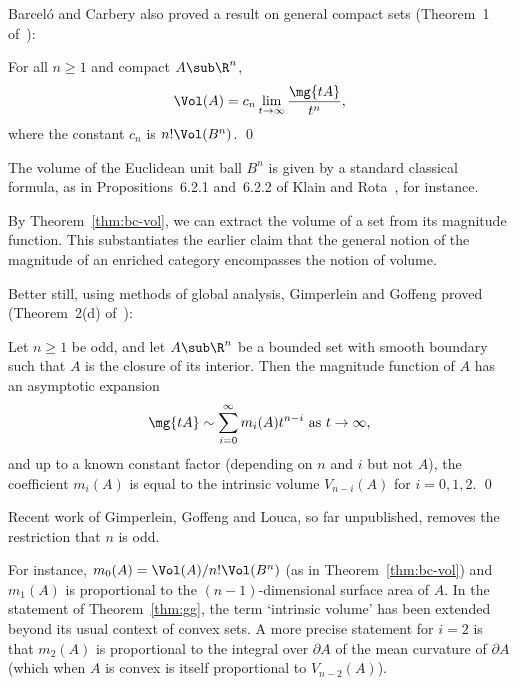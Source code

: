 Barcel\'o and Carbery also proved a result on general compact sets
(Theorem~1 of~\cite{BaCa}):

\begin{thm}
%
%
%
%
%
% 
For all $n \geq 1$ and compact $A \sub \R^n$, 
\[
\Vol(A) 
= 
c_n \lim_{t \to \infty} \frac{\mg{tA}}{t^n},
\]
where the constant $c_n$ is $n! \Vol(B^n)$. 
\qed
\end{thm}

The volume of the Euclidean unit ball $B^n$ is given by a standard
classical formula, as in Propositions~6.2.1 and~6.2.2 of Klain and
Rota~\cite{KlRo}, for instance.

By Theorem~\ref{thm:bc-vol}, we can extract the volume of a set from its
magnitude function.  This substantiates the earlier claim that the general
notion of the magnitude of an enriched category encompasses the notion of
volume.

Better still, using methods of global analysis, Gimperlein and Goffeng
proved (Theorem~2(d) of~\cite{GiGo}):

\begin{thm}
%
%
%
%
% 
Let $n \geq 1$ be odd, and let $A \sub \R^n$ be a bounded set with smooth
boundary such that $A$ is the closure of its interior.  Then the magnitude
function of $A$ has an asymptotic expansion
\[
\mg{tA}
\sim
\sum_{i = 0}^\infty m_i(A) t^{n - i}
\text{ as } t \to \infty,
\]
and up to a known constant factor (depending on $n$ and $i$ but not $A$),
the coefficient $m_i(A)$ is equal to the intrinsic volume $V_{n - i}(A)$
for $i = 0, 1, 2$.  
\qed
\end{thm}

Recent work of Gimperlein, Goffeng and Louca,%
%
%
so far unpublished, removes the restriction that $n$ is odd.

For instance, $m_0(A) = \Vol(A)/n!\Vol(B^n)$ (as in
Theorem~\ref{thm:bc-vol}) and $m_1(A)$ is proportional to the $(n -
1)$-dimensional surface%
%
% 
area of $A$.  In the statement of Theorem~\ref{thm:gg}, the term `intrinsic
volume' has been extended beyond its usual context of convex sets.  A more
precise statement for $i = 2$ is that $m_2(A)$ is proportional to the
integral over $\partial A$ of the mean%
% 
% 
curvature of $\partial A$ (which when $A$ is convex is itself proportional
to $V_{n - 2}(A)$).

